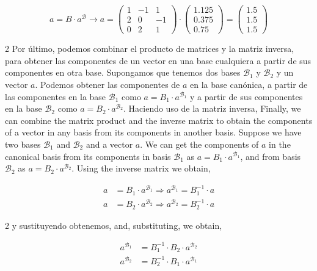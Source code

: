 \begin{equation*}
a=B\cdot a^{\mathcal{B}} \rightarrow a=\begin{pmatrix}
1& -1& 1\\
2& 0& -1\\
0& 2& 1
\end{pmatrix}\cdot \begin{pmatrix}
1.125\\
0.375\\
0.75
\end{pmatrix}
= \begin{pmatrix}
1.5\\
1.5\\
1.5
\end{pmatrix}
\end{equation*}

\begin{paracol}{2}
Por último, podemos combinar el producto de matrices y la matriz inversa, para obtener las componentes de un vector en una base cualquiera a partir de sus componentes en otra base. Supongamos que tenemos dos bases $\mathcal{B}_1$ y $\mathcal{B}_2$ y un vector $a$. Podemos obtener las componentes de $a$ en la base canónica, a partir de las componentes en la base $\mathcal{B}_1$ como $a=B_1\cdot a^{\mathcal{B}_1}$ y a partir de sus componentes en la base $\mathcal{B}_2$ como $a=B_2\cdot a^{\mathcal{B}_2}$. Haciendo uso de la matriz inversa,
\switchcolumn
Finally, we can combine the matrix product and the inverse matrix to obtain the components of a vector in any basis from its components in another basis. Suppose we have two bases $\mathcal{B}_1$ and $\mathcal{B}_2$ and a vector $a$. We can get the components of $a$ in the canonical basis from its components in basis $\mathcal{B}_1$ as $a=B_1\cdot a^{\mathcal{B}_1}$, and from basis $\mathcal{B}_2$ as $a=B_2\cdot a^{\mathcal{B}_2}$.
Using the inverse matrix we obtain,
\end{paracol}

\begin{align*}
a&=B_1\cdot a^{\mathcal{B}_1} \Rightarrow a^{\mathcal{B}_1}=B_1^{-1} \cdot a \\
 a&=B_2\cdot a^{\mathcal{B}_2} \Rightarrow a^{\mathcal{B}_2}=B_2^{-1} \cdot a
\end{align*}

\begin{paracol}{2}
y sustituyendo obtenemos,
\switchcolumn
and, substituting, we obtain,
\end{paracol}

\begin{align*}
a^{\mathcal{B}_1}&=B_1^{-1}\cdot B_2 \cdot a^{\mathcal{B}_2}\\
a^{\mathcal{B}_2}&=B_2^{-1} \cdot B_1\cdot a^{\mathcal{B}_1} 
\end{align*}

